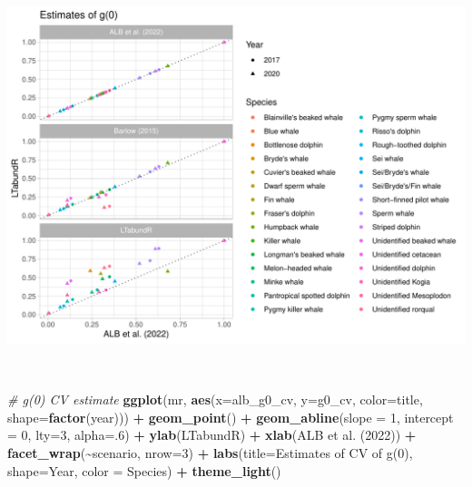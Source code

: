 \documentclass[
]{book}
\newenvironment{Shaded}{\begin{snugshade}}{\end{snugshade}}
\newcommand{\AttributeTok}[1]{\textcolor[rgb]{0.13,0.29,0.53}{#1}}
\newcommand{\CommentTok}[1]{\textcolor[rgb]{0.56,0.35,0.01}{\textit{#1}}}
\newcommand{\DecValTok}[1]{\textcolor[rgb]{0.00,0.00,0.81}{#1}}
\newcommand{\FunctionTok}[1]{\textcolor[rgb]{0.13,0.29,0.53}{\textbf{#1}}}
\newcommand{\NormalTok}[1]{#1}
\newcommand{\SpecialCharTok}[1]{\textcolor[rgb]{0.81,0.36,0.00}{\textbf{#1}}}
\newcommand{\StringTok}[1]{\textcolor[rgb]{0.31,0.60,0.02}{#1}}
\begin{document}
\includegraphics{figures/unnamed-chunk-388-1.pdf}

~

\begin{Shaded}
\begin{Highlighting}[]
\CommentTok{\# g(0) CV estimate}
\FunctionTok{ggplot}\NormalTok{(mr,}
       \FunctionTok{aes}\NormalTok{(}\AttributeTok{x=}\NormalTok{alb\_g0\_cv, }\AttributeTok{y=}\NormalTok{g0\_cv, }
           \AttributeTok{color=}\NormalTok{title, }\AttributeTok{shape=}\FunctionTok{factor}\NormalTok{(year))) }\SpecialCharTok{+}
    \FunctionTok{geom\_point}\NormalTok{() }\SpecialCharTok{+}
    \FunctionTok{geom\_abline}\NormalTok{(}\AttributeTok{slope =} \DecValTok{1}\NormalTok{, }\AttributeTok{intercept =} \DecValTok{0}\NormalTok{, }\AttributeTok{lty=}\DecValTok{3}\NormalTok{, }\AttributeTok{alpha=}\NormalTok{.}\DecValTok{6}\NormalTok{) }\SpecialCharTok{+}
    \FunctionTok{ylab}\NormalTok{(}\StringTok{\textquotesingle{}LTabundR\textquotesingle{}}\NormalTok{) }\SpecialCharTok{+} \FunctionTok{xlab}\NormalTok{(}\StringTok{\textquotesingle{}ALB et al. (2022)\textquotesingle{}}\NormalTok{) }\SpecialCharTok{+}
  \FunctionTok{facet\_wrap}\NormalTok{(}\SpecialCharTok{\textasciitilde{}}\NormalTok{scenario, }\AttributeTok{nrow=}\DecValTok{3}\NormalTok{) }\SpecialCharTok{+} 
  \FunctionTok{labs}\NormalTok{(}\AttributeTok{title=}\StringTok{\textquotesingle{}Estimates of CV of g(0)\textquotesingle{}}\NormalTok{, }
       \AttributeTok{shape=}\StringTok{\textquotesingle{}Year\textquotesingle{}}\NormalTok{, }\AttributeTok{color =} \StringTok{\textquotesingle{}Species\textquotesingle{}}\NormalTok{) }\SpecialCharTok{+} 
  \FunctionTok{theme\_light}\NormalTok{()}
\end{Highlighting}
\end{Shaded}
\end{document}
